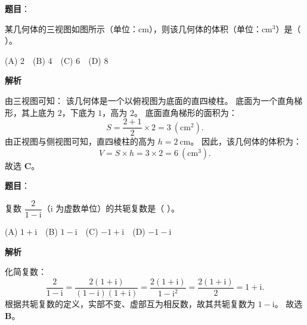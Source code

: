 \begin{answer}

\textbf{题目}：

某几何体的三视图如图所示（单位：$\mathrm{cm}$），则该几何体的体积（单位：$\mathrm{cm}^3$）是（ ）。
\nopagebreak[4]
\begin{center}\end{center}
\nopagebreak[4]
(A) $2$　(B) $4$　(C) $6$　(D) $8$

\textbf{解析}

由三视图可知：
该几何体是一个以俯视图为底面的直四棱柱。
底面为一个直角梯形，其上底为 $2$，下底为 $1$，高为 $2$。
底面直角梯形的面积为：
\nopagebreak[4]
\[S = \dfrac{2 + 1}{2} \times 2 = 3\ (\mathrm{cm}^2).\]
由正视图与侧视图可知，直四棱柱的高为 $h = 2\ \mathrm{cm}$。
因此，该几何体的体积为：
\nopagebreak[4]
\[V = S \times h = 3 \times 2 = 6\ (\mathrm{cm}^3).\]
故选 \textbf{C}。


\end{answer}
\begin{answer}

\textbf{题目}：

复数 $\dfrac{2}{1 - \mathrm i}$（$\mathrm i$ 为虚数单位）的共轭复数是（ ）。

(A) $1 + \mathrm i$　(B) $1 - \mathrm i$　(C) $-1 + \mathrm i$　(D) $-1 - \mathrm i$

\textbf{解析}

化简复数：
\nopagebreak[4]
\[\dfrac{2}{1 - \mathrm i} = \dfrac{2(1 + \mathrm i)}{(1 - \mathrm i)(1 + \mathrm i)} = \dfrac{2(1 + \mathrm i)}{1 - \mathrm i^2} = \dfrac{2(1 + \mathrm i)}{2} = 1 + \mathrm i.\]
根据共轭复数的定义，实部不变、虚部互为相反数，故其共轭复数为 $1 - \mathrm i$。
故选 \textbf{B}。


\end{answer}
